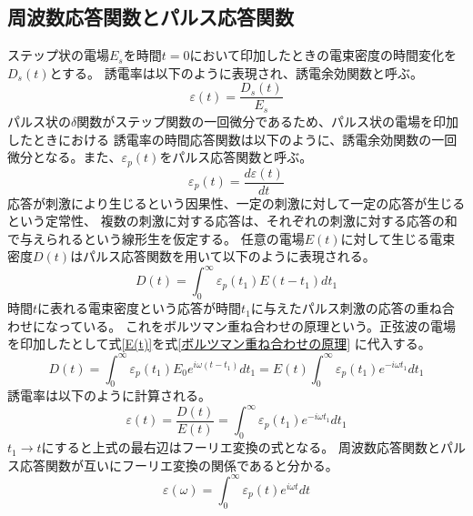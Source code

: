 \documentclass[dvipdfmx,12pt,a4paper]{jreport}
\begin{document}
			\subsection{周波数応答関数とパルス応答関数}
			ステップ状の電場$E_s$を時間$t=0$において印加したときの電束密度の時間変化を$D_s(t)$とする。
			誘電率は以下のように表現され、誘電余効関数と呼ぶ。
			\begin{equation}
				\varepsilon(t)=\frac{D_s(t)}{E_s}
			\end{equation}
			パルス状の$\delta$関数がステップ関数の一回微分であるため、パルス状の電場を印加したときにおける
			誘電率の時間応答関数は以下のように、誘電余効関数の一回微分となる。また、$\varepsilon_p(t)$をパルス応答関数と呼ぶ。
			\begin{equation}
				\varepsilon_p(t)=\frac{d\varepsilon(t)}{dt}
				\label{パルス応答関数}
			\end{equation}
			応答が刺激により生じるという因果性、一定の刺激に対して一定の応答が生じるという定常性、
			複数の刺激に対する応答は、それぞれの刺激に対する応答の和で与えられるという線形生を仮定する。
			任意の電場$E(t)$に対して生じる電束密度$D(t)$はパルス応答関数を用いて以下のように表現される。
			\begin{equation}
				D(t)=\int^{\infty}_0 \varepsilon_p(t_1)E(t-t_1) dt_1
				\label{ボルツマン重ね合わせの原理}
			\end{equation}
			時間$t$に表れる電束密度という応答が時間$t_1$に与えたパルス刺激の応答の重ね合わせになっている。
			これをボルツマン重ね合わせの原理という。正弦波の電場を印加したとして式\ref{E(t)}を式\ref{ボルツマン重ね合わせの原理}
			に代入する。
			\begin{equation}
				D(t)=\int^{\infty}_0 \varepsilon_p(t_1)E_0e^{i\omega(t-t_1)}dt_1=E(t)\int^{\infty}_0 \varepsilon_p(t_1)e^{-i\omega t_1}dt_1
			\end{equation}
			誘電率は以下のように計算される。
			\begin{equation}
				\varepsilon(t)=\frac{D(t)}{E(t)}=\int^{\infty}_0 \varepsilon_p(t_1)e^{-i\omega t_1} dt_1
			\end{equation}
			$t_1\rightarrow t$にすると上式の最右辺はフーリエ変換の式となる。
			周波数応答関数とパルス応答関数が互いにフーリエ変換の関係であると分かる。
			\begin{equation}
				\varepsilon(\omega)=\int^{\infty}_0 \varepsilon_p(t)e^{i\omega t}dt
				\label{周波数応答関数とパルス応答関数のフーリエ変換}
			\end{equation}
\end{document}
